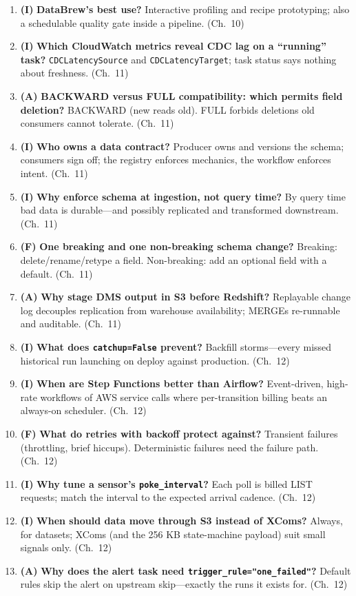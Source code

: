 \begin{enumerate}
    4 vCPU + 16 GB, billed per second with a one-minute minimum. (Ch.~10)
    \item \textbf{(I)} \textbf{DataBrew's best use?}
    Interactive profiling and recipe prototyping; also a schedulable quality gate inside a
    pipeline. (Ch.~10)
    \item \textbf{(I)} \textbf{Which CloudWatch metrics reveal CDC lag on a ``running'' task?}
    \texttt{CDCLatencySource} and \texttt{CDCLatencyTarget}; task status says nothing about
    freshness. (Ch.~11)
    \item \textbf{(A)} \textbf{BACKWARD versus FULL compatibility: which permits field deletion?}
    BACKWARD (new reads old). FULL forbids deletions old consumers cannot tolerate. (Ch.~11)
    \item \textbf{(I)} \textbf{Who owns a data contract?}
    Producer owns and versions the schema; consumers sign off; the registry enforces mechanics,
    the workflow enforces intent. (Ch.~11)
    \item \textbf{(I)} \textbf{Why enforce schema at ingestion, not query time?}
    By query time bad data is durable---and possibly replicated and transformed downstream.
    (Ch.~11)
    \item \textbf{(F)} \textbf{One breaking and one non-breaking schema change?}
    Breaking: delete/rename/retype a field. Non-breaking: add an optional field with a default.
    (Ch.~11)
    \item \textbf{(A)} \textbf{Why stage DMS output in S3 before Redshift?}
    Replayable change log decouples replication from warehouse availability; MERGEs re-runnable
    and auditable. (Ch.~11)
    \item \textbf{(I)} \textbf{What does \texttt{catchup=False} prevent?}
    Backfill storms---every missed historical run launching on deploy against production. (Ch.~12)
    \item \textbf{(I)} \textbf{When are Step Functions better than Airflow?}
    Event-driven, high-rate workflows of AWS service calls where per-transition billing beats an
    always-on scheduler. (Ch.~12)
    \item \textbf{(F)} \textbf{What do retries with backoff protect against?}
    Transient failures (throttling, brief hiccups). Deterministic failures need the failure path.
    (Ch.~12)
    \item \textbf{(I)} \textbf{Why tune a sensor's \texttt{poke\_interval}?}
    Each poll is billed LIST requests; match the interval to the expected arrival cadence. (Ch.~12)
    \item \textbf{(I)} \textbf{When should data move through S3 instead of XComs?}
    Always, for datasets; XComs (and the 256 KB state-machine payload) suit small signals only.
    (Ch.~12)
    \item \textbf{(A)} \textbf{Why does the alert task need \texttt{trigger\_rule="one\_failed"}?}
    Default rules skip the alert on upstream skip---exactly the runs it exists for. (Ch.~12)
\end{enumerate}

